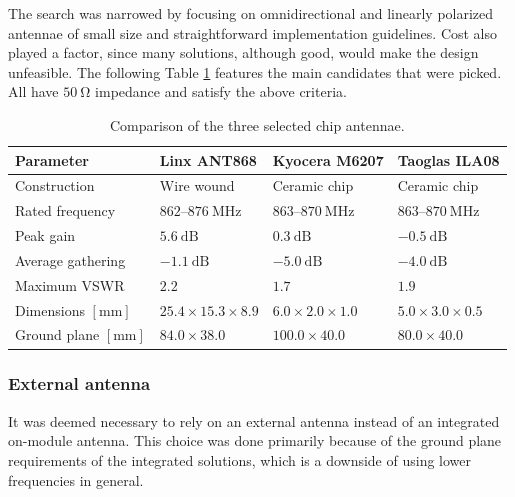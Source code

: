 The search was narrowed by focusing on omnidirectional and linearly polarized antennae of small size and straightforward implementation guidelines. Cost also played a factor, since many solutions, although good, would make the design unfeasible. The following Table \ref{table:antenna-chip} features the main candidates that were picked. All have $50~\mathrm{\Omega}$ impedance and satisfy the above criteria.

\begin{table}
\begin{center}
\caption{\label{table:antenna-chip}Comparison of the three selected chip antennae.}
    \begin{tabular}{|l|l|l|l|} \hline
    \textbf{Parameter} & \textbf{Linx ANT868}\cite{linx_technologies_he_2024} & \textbf{Kyocera M6207}\cite{kyocera_ism_2024} & \textbf{Taoglas ILA08}\cite{taoglas_ila08_nodate} \\ \hline
    Construction & Wire wound & Ceramic chip & Ceramic chip \\ \hline
    Rated frequency                 & $862 \text{--} 876~\mathrm{MHz}$ & $863 \text{--} 870~\mathrm{MHz}$ & $863 \text{--} 870~\mathrm{MHz}$ \\ \hline
    Peak gain                       & $5.6~\mathrm{dB}$     & $0.3~\mathrm{dB}$     & $-0.5~\mathrm{dB}$ \\ \hline
    Average gathering               & $-1.1~\mathrm{dB}$    & $-5.0~\mathrm{dB}$    & $-4.0~\mathrm{dB}$ \\ \hline
    Maximum VSWR                    & $2.2$                 & $1.7$                 & $1.9$ \\ \hline
    Dimensions $\mathrm{[mm]}$      & $25.4 \times 15.3 \times 8.9$ & $6.0 \times 2.0 \times 1.0$ & $5.0 \times 3.0 \times 0.5$ \\ \hline
    Ground plane $\mathrm{[mm]}$    & $84.0 \times 38.0$ & $100.0 \times 40.0$ & $80.0 \times 40.0$ \\ \hline
    \end{tabular}
\end{center}
\end{table}

\subsubsection{External antenna}
It was deemed necessary to rely on an external antenna instead of an integrated on-module antenna. This choice was done primarily because of the ground plane requirements of the integrated solutions, which is a downside of using lower frequencies in general.


